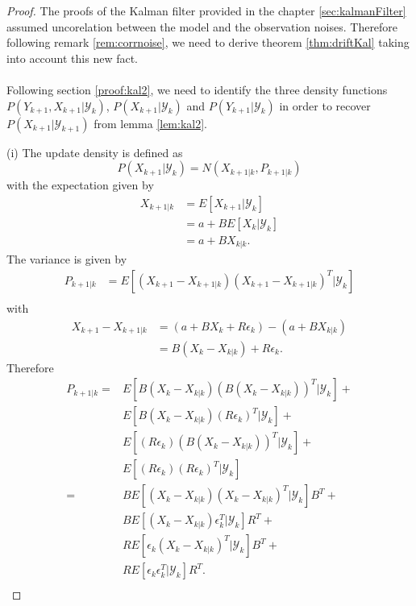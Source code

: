 \documentclass{article}
\theoremstyle{definition}
\theoremstyle{remark}
\newcommand{\filtrationObs}[1]{\ensuremath{\mathscr{Y}_{#1}}}
\begin{document}
\begin{proof}
The proofs of the Kalman filter provided in the chapter \ref{sec:kalmanFilter} assumed uncorelation between the model and the observation noises. Therefore following remark \ref{rem:corrnoise}, we need to derive theorem \ref{thm:driftKal} taking into account this new fact.\\
\\
Following section \ref{proof:kal2}, we need to identify the three density functions $P(Y_{k+1},X_{k+1}|\filtrationObs{k})$, $P(X_{k+1}|\filtrationObs{k})$ and $P(Y_{k+1}|\filtrationObs{k})$ in order to recover $P(X_{k+1}|\filtrationObs{k+1})$ from lemma \ref{lem:kal2}.

(i) The update density is defined as
$$P(X_{k+1}|\filtrationObs{k})=N(X_{k+1|k},P_{k+1|k})$$
with the expectation given by
\begin{align*}
X_{k+1|k}&=E[X_{k+1}|\filtrationObs{k}]\\
&=a+BE[X_k|\filtrationObs{k}]\\ 
&=a+BX_{k|k}.
\end{align*}
The variance is given by
\begin{align*}
P_{k+1|k}&=E[(X_{k+1}-X_{k+1|k})(X_{k+1}-X_{k+1|k})^T|\filtrationObs{k}]\\
\end{align*}
with 
\begin{align*}
X_{k+1}-X_{k+1|k}&=(a+BX_k+R\epsilon_k)-(a+BX_{k|k})\\
&=B(X_k-X_{k|k})+R\epsilon_k.
\end{align*}
Therefore
\begin{align*}
P_{k+1|k}=&E[B(X_k-X_{k|k})(B(X_k-X_{k|k}))^T|\filtrationObs{k}]+\\
&E[B(X_k-X_{k|k})(R\epsilon_k)^T|\filtrationObs{k}]+\\
&E[(R\epsilon_k)(B(X_k-X_{k|k}))^T|\filtrationObs{k}]+\\
&E[(R\epsilon_k)(R\epsilon_k)^T|\filtrationObs{k}]\\
%
=&BE[(X_k-X_{k|k})(X_k-X_{k|k})^T|\filtrationObs{k}]B^T+\\
&BE[(X_k-X_{k|k})\epsilon_k^T|\filtrationObs{k}]R^T+\\
&RE[\epsilon_k(X_k-X_{k|k})^T|\filtrationObs{k}]B^T+\\
&RE[\epsilon_k\epsilon_k^T|\filtrationObs{k}]R^T.\\
\end{align*}


\end{proof}
\end{document}
